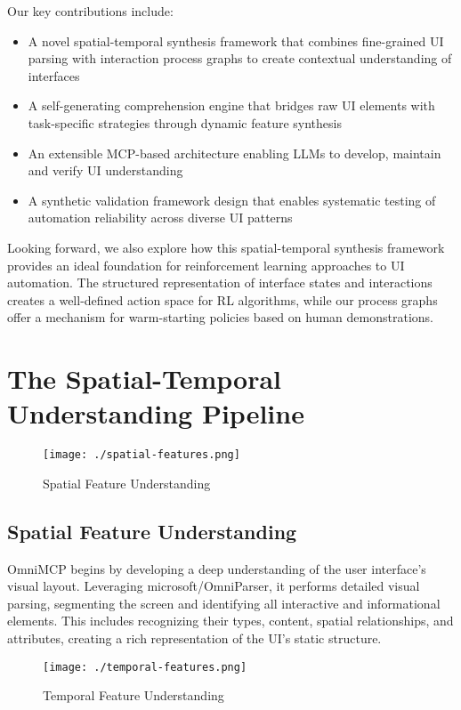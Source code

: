 \documentclass{article}
\begin{document}
Our key contributions include:
\begin{itemize}
    \item A novel spatial-temporal synthesis framework that combines fine-grained UI parsing with interaction process graphs to create contextual understanding of interfaces
    \item A self-generating comprehension engine that bridges raw UI elements with task-specific strategies through dynamic feature synthesis
    \item An extensible MCP-based architecture enabling LLMs to develop, maintain and verify UI understanding
    \item A synthetic validation framework design that enables systematic testing of automation reliability across diverse UI patterns
\end{itemize}

Looking forward, we also explore how this spatial-temporal synthesis framework provides an ideal foundation for reinforcement learning approaches to UI automation. The structured representation of interface states and interactions creates a well-defined action space for RL algorithms, while our process graphs offer a mechanism for warm-starting policies based on human demonstrations.

\section{The Spatial-Temporal Understanding Pipeline}

\begin{figure}[h]
\centering
\texttt{[image: ./spatial-features.png]}
\caption{Spatial Feature Understanding}
\label{fig:spatial}
\end{figure}

\subsection{Spatial Feature Understanding}
OmniMCP begins by developing a deep understanding of the user interface's visual layout. Leveraging microsoft/OmniParser, it performs detailed visual parsing, segmenting the screen and identifying all interactive and informational elements. This includes recognizing their types, content, spatial relationships, and attributes, creating a rich representation of the UI's static structure.

\begin{figure}[h]
\centering
\texttt{[image: ./temporal-features.png]}
\caption{Temporal Feature Understanding}
\label{fig:temporal}
\end{figure}
\end{document}

